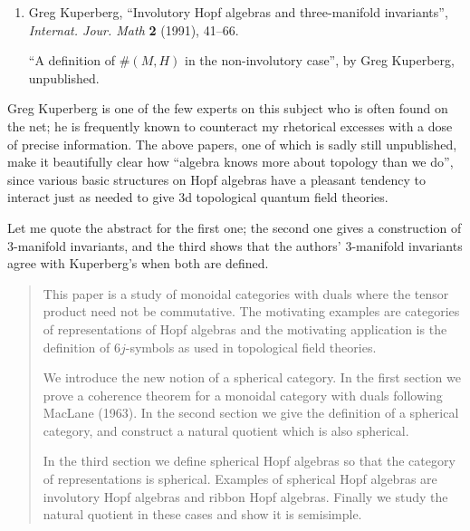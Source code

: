 \documentclass{article}
\renewcommand{\texttt}[1]{%
  \begingroup
  \ttfamily
  \begingroup\lccode`~=`/\lowercase{\endgroup\def~}{/\discretionary{}{}{}}%
  \begingroup\lccode`~=`[\lowercase{\endgroup\def~}{[\discretionary{}{}{}}%
  \begingroup\lccode`~=`.\lowercase{\endgroup\def~}{.\discretionary{}{}{}}%
  \catcode`/=\active\catcode`[=\active\catcode`.=\active
  \scantokens{#1\noexpand}%
  \endgroup
}
\begin{document}
\begin{enumerate}
\def\labelenumi{\arabic{enumi})}
\setcounter{enumi}{2}
\item
  Greg Kuperberg, ``Involutory Hopf algebras and three-manifold
  invariants'', \emph{Internat. Jour. Math} \textbf{2} (1991), 41--66.

  ``A definition of \(\#(M,H)\) in the non-involutory case'', by Greg
  Kuperberg, unpublished.
\end{enumerate}
\noindent
Greg Kuperberg is one of the few experts on this subject who is often
found on the net; he is frequently known to counteract my rhetorical
excesses with a dose of precise information. The above papers, one of
which is sadly still unpublished, make it beautifully clear how
``algebra knows more about topology than we do'', since various basic
structures on Hopf algebras have a pleasant tendency to interact just as
needed to give 3d topological quantum field theories.

\noindent
Let me quote the abstract for the first one; the second one gives a
construction of 3-manifold invariants, and the third shows that the
authors' 3-manifold invariants agree with Kuperberg's when both are
defined.

\begin{quote}
This paper is a study of monoidal categories with duals where the tensor
product need not be commutative. The motivating examples are categories
of representations of Hopf algebras and the motivating application is
the definition of \(6j\)-symbols as used in topological field theories.

We introduce the new notion of a spherical category. In the first
section we prove a coherence theorem for a monoidal category with duals
following MacLane (1963). In the second section we give the definition
of a spherical category, and construct a natural quotient which is also
spherical.

In the third section we define spherical Hopf algebras so that the
category of representations is spherical. Examples of spherical Hopf
algebras are involutory Hopf algebras and ribbon Hopf algebras. Finally
we study the natural quotient in these cases and show it is semisimple.
\end{quote}
\end{document}
